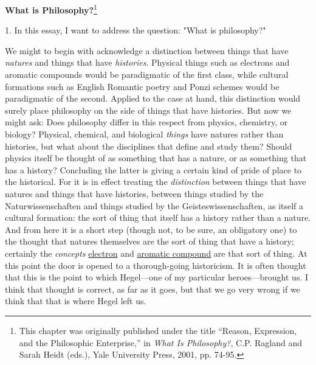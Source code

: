 \textbf{What is Philosophy?}\footnote{This chapter was originally
  published under the title ``Reason, Expression, and the Philosophic
  Enterprise,'' in \emph{What Is Philosophy?}, C.P. Ragland and Sarah
  Heidt (eds.), Yale University Press, 2001, pp. 74-95.}

1. In this essay, I want to address the question: "What is philosophy?"

We might to begin with acknowledge a distinction between things that
have \emph{natures} and things that have \emph{histories}. Physical
things such as electrons and aromatic compounds would be paradigmatic of
the first class, while cultural formations such as English Romantic
poetry and Ponzi schemes would be paradigmatic of the second. Applied to
the case at hand, this distinction would surely place philosophy on the
side of things that have histories. But now we might ask: Does
philosophy differ in this respect from physics, chemistry, or biology?
Physical, chemical, and biological \emph{things} have natures rather
than histories, but what about the disciplines that define and study
them? Should physics itself be thought of as something that has a
nature, or as something that has a history? Concluding the latter is
giving a certain kind of pride of place to the historical. For it is in
effect treating the \emph{distinction} between things that have natures
and things that have histories, between things studied by the
Naturwissenschaften and things studied by the Geisteswissenschaften, as
itself a cultural formation: the sort of thing that itself has a history
rather than a nature. And from here it is a short step (though not, to
be sure, an obligatory one) to the thought that natures themselves are
the sort of thing that have a history; certainly the \emph{concepts}
\underline{electron} and \underline{aromatic compound} are that sort of
thing. At this point the door is opened to a thorough-going historicism.
It is often thought that this is the point to which Hegel---one of my
particular heroes---brought us. I think that thought is correct, as far
as it goes, but that we go very wrong if we think that that is where
Hegel left us.

